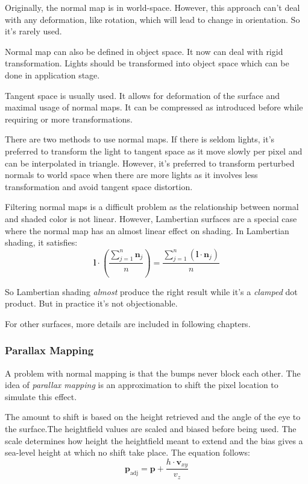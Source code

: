 \documentclass[10pt, a4paper]{article}
\begin{document}
        Originally, the normal map is in world-space. However, this approach can't deal with any deformation, like rotation, which will lead to change in orientation. So it's rarely used. 

        Normal map can also be defined in object space. It now can deal with rigid transformation. Lights should be transformed into object space which can be done in application stage. 

        Tangent space is usually used. It allows for deformation of the surface and maximal usage of normal maps. It can be compressed as introduced before while requiring or more transformations. 

        There are two methods to use normal maps. If there is seldom lights, it's preferred to transform the light to tangent space as it move slowly per pixel and can be interpolated in triangle. However, it's preferred to transform perturbed normals to world space when there are more lights as it involves less transformation and avoid tangent space distortion. 

        Filtering normal maps is a difficult problem as the relationship between normal and shaded color is not linear. However, Lambertian surfaces are a special case where the normal map has an almost linear effect on shading. In Lambertian shading, it satisfies: 
        \begin{equation*}
            \textbf{l} \cdot (\frac{\sum_{j = 1}^n\textbf{n}_j}{n}) = \frac{\sum_{j = 1}^n(\textbf{l} \cdot \textbf{n}_j)}{n} 
        \end{equation*}

        So Lambertian shading \emph{almost} produce the right result while it's a \emph{clamped} dot product. But in practice it's not objectionable. 

        For other surfaces, more details are included in following chapters. 

    \subsubsection{Parallax Mapping}
        A problem with normal mapping is that the bumps never block each other. The idea of \emph{parallax mapping} is an approximation to shift the pixel location to simulate this effect. 

        The amount to shift is based on the height retrieved and the angle of the eye to the surface.The heightfield values are scaled and biased before being used. The scale determines how height the heightfield meant to extend and the bias gives a sea-level height at which no shift take place. The equation follows: 
        \begin{equation*}
            \textbf{p}_{\text{adj}} = \textbf{p} + \frac{h\cdot \textbf{v}_{xy}}{v_{z}}
        \end{equation*} 
        
\end{document}

